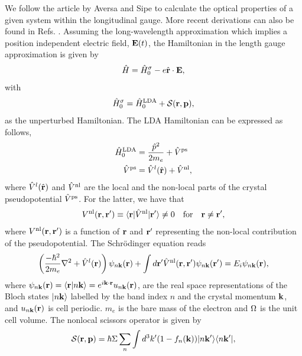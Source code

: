 \documentclass[floatfix,prb,aps,superscriptaddress,11pt,preprint,letterpaper]{revtex4}
\begin{document}
We follow the article by Aversa and Sipe\cite{aversaPRB95} to calculate 
the optical properties of a given system within the longitudinal gauge. 
More recent derivations
can also be found in Refs. .  
Assuming the long-wavelength approximation which implies 
a position independent electric field, 
$\mathbf{E}(t)$,  
the Hamiltonian in the length gauge approximation is given by
\begin{equation}\label{ache}
\hat{H}=\hat{H}^\sigma_0-e \hat{\mathbf{r}} \cdot \mathbf{E},
\end{equation}
with
\begin{align}\label{ache.1}
\hat H^\sigma_0=\hat H^{\mathrm{LDA}}_0
 + {\cal S}(\mathbf{r},\mathbf{p})
,
\end{align} 
as the unperturbed Hamiltonian.
The LDA Hamiltonian can be expressed as follows,
\begin{align}\label{ache.2}
\hat H^{\mathrm{LDA}}_0&=\frac{\hat p^2}{2m_e}  + \hat V^{\mathrm{ps}}
\nonumber\\
\hat V^{\mathrm{ps}}
&=\hat V^l(\hat{\mathbf{r}}) + \hat V^{\mathrm{nl}}
,
\end{align}  
where $\hat V^l(\hat{\mathbf{r}})$ and $\hat V^{\mathrm{nl}}$ are the local and
the non-local parts of the  
crystal 
pseudopotential $\hat V^{\mathrm{ps}}$. For the latter, we have that
\begin{align}\label{ache.3n}
 V^{\mathrm{nl}}(\mathbf{r},\mathbf{r}')
\equiv \langle \mathbf{r} |\hat V^{\mathrm{nl}}| \mathbf{r}' \rangle\neq 0 \quad\mathrm{for}\quad\mathbf{r}\neq\mathbf{r}'
,
\end{align}
where $V^{\mathrm{nl}}(\mathbf{r},\mathbf{r}')$ is a function of $\mathbf{r}$ and $\mathbf{r}'$
representing the non-local contribution of the pseudopotential.
The Schr\"odinger equation reads
\begin{align}\label{ache.4} 
\left(
\frac{-\hbar^2}{2m_e}\nabla^2
 + \hat V^l(\mathbf{r})\right)\psi_{n\mathbf{k}}(\mathbf{r})
 + \int d\mathbf{r}'\hat V^{\mathrm{nl}}(\mathbf{r},\mathbf{r}')\psi_{n\mathbf{k}}(\mathbf{r}')
=E_i\psi_{n\mathbf{k}}(\mathbf{r})
,
\end{align} 
where
$\psi_{n\mathbf{k}}(\mathbf{r})=\langle {\mathbf{r}} | {n\mathbf{k}} \rangle=e^{i\mathbf{k}\cdot\mathbf{r}}u_{n\mathbf{k}}(\mathbf{r})$,
are the real space representations of the Bloch states $| n\mathbf{k} \rangle$ labelled
by the band index $n$ and the crystal momentum $\mathbf{k}$, and $u_{n\mathbf{k}}(\mathbf{r})$
is cell periodic. $m_e$ is the bare mass of the electron and $\Omega$ is the 
unit cell volume. The nonlocal scissors operator is given by 
\begin{equation}\label{chon.0}
{\cal S}(\mathbf{r},\mathbf{p})=\hbar\Sigma\sum_n\int d^3k'(1-f_n(\mathbf{k})) | n\mathbf{k}' \rangle\langle n\mathbf{k}' |
,
\end{equation}
\end{document}
